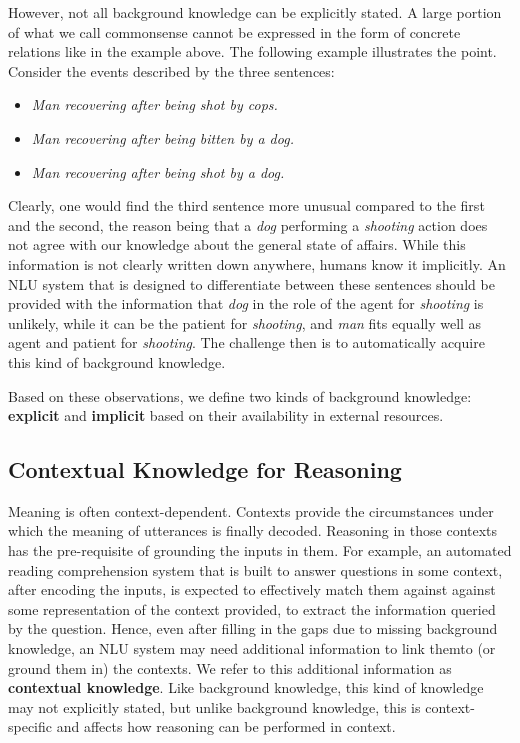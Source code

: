 However, not all background knowledge can be explicitly stated. A large portion of what we call
commonsense cannot be expressed in the form of concrete relations like in the example above.
The following example illustrates the point. Consider the events described by the three sentences:

\begin{itemize}
 \item[] \textit{Man recovering after being shot by cops.}
 \item[] \textit{Man recovering after being bitten by a dog.}
 \item[] \textit{Man recovering after being shot by a dog.}
\end{itemize}

Clearly, one would find the third sentence more unusual compared to the first and the second, the reason being that
a \emph{dog} performing a \emph{shooting} action does not agree with our knowledge about the general state
of affairs. While this information is not clearly written down anywhere, humans know it implicitly. An NLU
system that is designed to differentiate between these sentences should be provided with the information
that \emph{dog} in the role of the agent for \emph{shooting} is unlikely, while it can be the patient for
\emph{shooting}, and \emph{man} fits equally well as agent and patient for \emph{shooting}. The challenge then is to automatically acquire this kind of background knowledge.

Based on these observations, we define two kinds of background knowledge: \textbf{explicit} and \textbf{implicit} based on their availability in external resources.


\subsection{Contextual Knowledge for Reasoning}
Meaning is often context-dependent. Contexts provide the circumstances under which the meaning of utterances is finally decoded. Reasoning in those contexts has the pre-requisite of grounding the inputs
in them.
For example, an automated reading comprehension system that is built to answer questions in some context, after encoding the inputs, is expected to
effectively match them against against some representation of the context provided, to extract the information queried by the question.
Hence, even after filling in the gaps due to missing background knowledge, an NLU system may need additional information to link themto (or ground them in) the contexts.
We refer to this additional information as \textbf{contextual knowledge}.
Like background knowledge, this kind of knowledge may not explicitly stated, but unlike background knowledge, this is context-specific and affects how reasoning can be performed in context.

